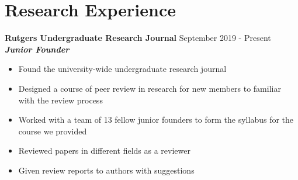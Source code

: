 \documentclass{article}
\begin{document}
\section{Research Experience}
\textbf{Rutgers Undergraduate Research Journal}
\hfill{September 2019 - Present}\\
\textbf{\textit{Junior Founder}}
\begin{itemize}
  \itemsep0em
  \item Found the university-wide undergraduate research journal
  \item Designed a course of peer review in research for new members to familiar with the
review process
  \item  Worked with a team of 13 fellow junior founders to form the syllabus for the course we
provided
  \item Reviewed papers in different fields as a reviewer
  \item Given review reports to authors with suggestions
\end{itemize}
\end{document}

